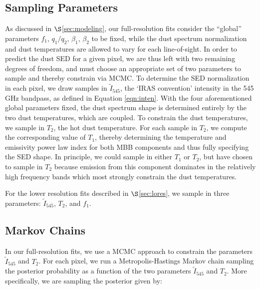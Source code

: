 \documentclass{emulateapj}
\begin{document}
\subsection{Sampling Parameters}
\label{sec:samp}
As discussed in $\S$\ref{sec:modeling}, our full-resolution fits
consider the ``global'' parameters $f_1$, $q_1/q_2$, $\beta_1$, $\beta_2$ to be
fixed, while the dust spectrum normalization and dust temperatures are allowed 
to vary for each line-of-sight. In order to predict the dust SED for a given 
pixel, we are thus left with two remaining degrees of freedom, and must 
choose an appropriate set of two parameters to sample and thereby constrain via
MCMC. To determine the SED normalization in each pixel, we draw samples in 
$\tilde{I}_{545}$, the `IRAS convention' intensity in the 545 GHz bandpass, 
as defined in Equation \ref{eqn:inten}. With the four aforementioned global 
parameters fixed, the dust spectrum shape is determined entirely by the two 
dust temperatures, which are coupled. To constrain the dust temperatures,
 we sample in $T_2$, the hot dust temperature. For each sample in $T_2$, we 
compute the corresponding value of $T_1$, thereby determining the temperature
and emissivity power law index for both MBB components and thus fully 
specifying the SED shape. In principle, we could sample in either $T_1$ or 
$T_2$, but have chosen to sample in $T_2$ because emission from this component 
dominates in the relatively high frequency bands which most strongly constrain 
the dust temperatures.

For the lower resolution fits described in $\S$\ref{sec:lores}, we sample
in three parameters: $\tilde{I}_{545}$, $T_2$, and $f_1$.


\subsection{Markov Chains}
\label{sec:mcmc}

In our full-resolution fits, we use a MCMC approach to constrain the 
parameters $\tilde{I}_{545}$ and $T_2$. For each pixel, we run a 
Metropolis-Hastings Markov chain sampling the posterior probability as a 
function of the two parameters $\tilde{I}_{545}$ and $T_2$. More specifically, 
we are sampling the posterior given by:

\end{document}
